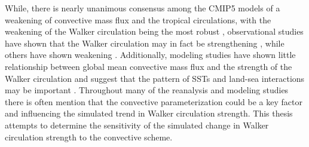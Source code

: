 \documentclass[letterpaper,12pt,titlepage,oneside,final]{book}
\begin{document}
While, there is nearly unanimous consensus among the CMIP5 models of a weakening of convective mass flux \citep{chadwick_spatial_2012} and the tropical circulations, with the weakening of the Walker circulation being the most robust \citep{he_anthropogenic_2015}, observational studies have shown that the Walker circulation may in fact be strengthening \citep{lheureux_recent_2013,sandeep_pacific_2014}, while others have shown weakening \citep{vecchi_weakening_2006,power_what_2011}. Additionally, modeling studies have shown little relationship between global mean convective mass flux and the strength of the Walker circulation and suggest that the pattern of SSTs and land-sea interactions may be important \citep{sandeep_pacific_2014,li_strengthening_2015}. Throughout many of the reanalysis and modeling studies there is often mention that the convective parameterization could be a key factor and influencing the simulated trend in Walker circulation strength. This thesis attempts to determine the sensitivity of the simulated change in Walker circulation strength to the convective scheme.  
\end{document}
